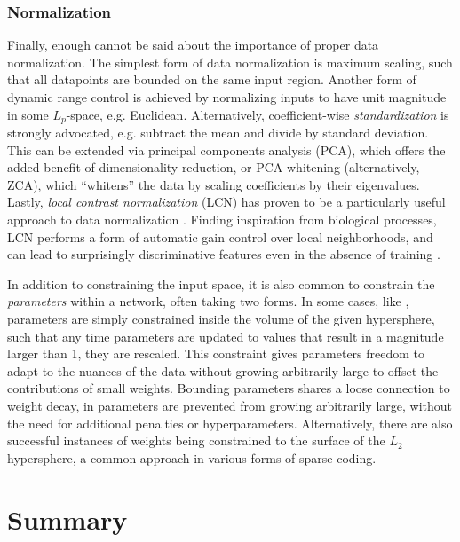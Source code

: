 \subsubsection{Normalization}

Finally, enough cannot be said about the importance of proper data normalization.
The simplest form of data normalization is maximum scaling, such that all datapoints are bounded on the same input region.
Another form of dynamic range control is achieved by normalizing inputs to have unit magnitude in some $L_p$-space, e.g. Euclidean.
Alternatively, coefficient-wise \emph{standardization} is strongly advocated, e.g. subtract the mean and divide by standard deviation.
This can be extended via principal components analysis (PCA), which offers the added benefit of dimensionality reduction, or PCA-whitening (alternatively, ZCA), which ``whitens'' the data by scaling coefficients by their eigenvalues.
Lastly, \emph{local contrast normalization} (LCN) has proven to be a particularly useful approach to data normalization \cite{Sermanet2013Pedestrian}.
Finding inspiration from biological processes, LCN performs a form of automatic gain control over local neighborhoods, and can lead to surprisingly discriminative features even in the absence of training \cite{Kavukcuoglu2010Learning}.

In addition to constraining the input space, it is also common to constrain the \emph{parameters} within a network, often taking two forms.
In some cases, like \cite{Hinton2012Improving}, parameters are simply constrained inside the volume of the given hypersphere, such that any time parameters are updated to values that result in a magnitude larger than 1, they are rescaled.
This constraint gives parameters freedom to adapt to the nuances of the data without growing arbitrarily large to offset the contributions of small weights.
Bounding parameters shares a loose connection to weight decay, in parameters are prevented from growing arbitrarily large, without the need for additional penalties or hyperparameters.
Alternatively, there are also successful instances of weights being constrained to the surface of the $L_2$ hypersphere, a common approach in various forms of sparse coding.


\section{Summary}
\label{sec:deep_summary}

